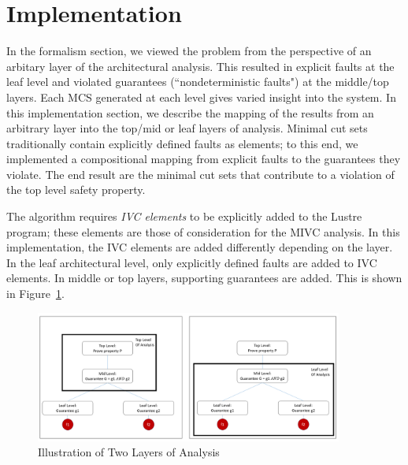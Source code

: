 \section{Implementation}
\label{sec:impl}
In the formalism section, we viewed the problem from the perspective of an arbitary layer of the architectural analysis. This resulted in explicit faults at the leaf level and violated guarantees (``nondeterministic faults") at the middle/top layers. Each MCS generated at each level gives varied insight into the system. In this implementation section, we describe the mapping of the results from an arbitrary layer into the top/mid or leaf layers of analysis. Minimal cut sets traditionally contain explicitly defined faults as elements; to this end, we implemented a compositional mapping from explicit faults to the guarantees they violate. The end result are the minimal cut sets that contribute to a violation of the top level safety property. 

The \aivcalg algorithm requires \emph{IVC elements} to be explicitly added to the Lustre program; these elements are those of consideration for the MIVC analysis. In this implementation, the IVC elements are added differently depending on the layer. In the leaf architectural level, only explicitly defined faults are added to IVC elements. In middle or top layers, supporting guarantees are added. This is shown in Figure~\ref{fig:layers}. 

\begin{figure}[h!]
	\begin{center}
		\includegraphics[width=0.9\textwidth]{images/twoLevels.PNG}
	\end{center}
	\vspace{-2em}
	\caption{Illustration of Two Layers of Analysis}
	\label{fig:layers}
	\vspace{-2em}
\end{figure}

